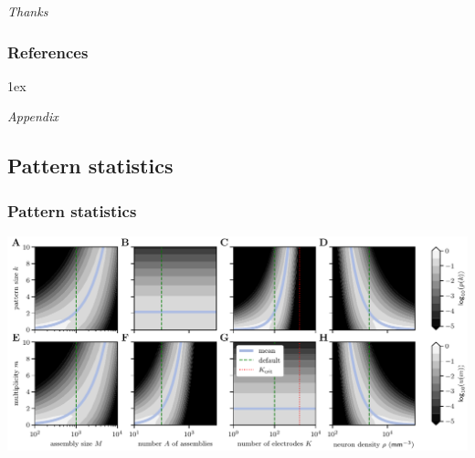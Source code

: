 \documentclass[8pt,t,usepdftitle=false]{beamer}
\begin{document}
\begin{frame}[t,plain]
  \begin{center}
    \vspace*{\fill}
    \LARGE\emph{\it Thanks}
    \vspace*{\fill}
  \end{center}
\end{frame}
\begin{frame}  
  \frametitle{References}
  \bibitemsep1ex
  \renewcommand{\bibfont}{\normalfont\small}
  \printbibliography
\end{frame}
\begin{frame}[t,plain]
  \begin{center}
    \vspace*{\fill}
    \LARGE \emph{Appendix}
    \vspace*{\fill}
  \end{center}
\end{frame}
\def\ttl{Pattern statistics}
\subsection{\ttl}
\begin{frame}[plain]
  \frametitle{\ttl}
  \parbox{\linewidth}{
    \includegraphics[width=\linewidth]{./figures/minimal_model_stats_3d.pdf}\\
    {\small}
  }
\end{frame}
\def\ttl{Assembly detectability}
\end{document}
